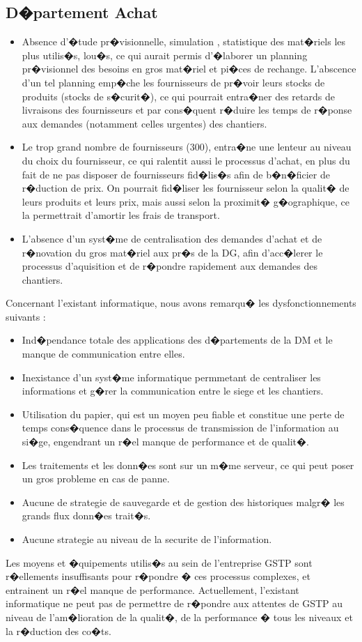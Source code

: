 \documentclass{article}
\begin{document}
		\subsection{D�partement Achat}
				\begin{itemize}
				    \item Absence d'�tude pr�visionnelle, simulation , statistique des mat�riels les plus utilis�s, lou�s, ce qui aurait permis d'�laborer un planning pr�visionnel des besoins en gros mat�riel et pi�ces de rechange. L'abscence d'un tel planning emp�che les fournisseurs de pr�voir leurs stocks de produits (stocks de s�curit�), ce qui pourrait entra�ner des retards de livraisons des fournisseurs et par cons�quent r�duire les temps de r�ponse aux demandes (notamment celles urgentes) des chantiers.
						\item Le trop grand nombre de fournisseurs (300), entra�ne une lenteur au niveau du choix du fournisseur, ce qui ralentit aussi le processus d'achat, en plus du fait de ne pas disposer de fournisseurs fid�lis�s afin de b�n�ficier de r�duction de prix. On pourrait fid�liser les fournisseur selon la qualit� de leurs produits et leurs prix, mais aussi selon la proximit� g�ographique, ce la permettrait d'amortir les frais de transport.
						\item L'absence d'un syst�me de centralisation des demandes d'achat et de r�novation du gros mat�riel aux pr�s de la DG, afin d'acc�lerer le processus d'aquisition et de r�pondre rapidement aux demandes des chantiers.
				\end{itemize}
		
		Concernant l'existant informatique, nous avons remarqu� les dysfonctionnements suivants :
		\begin{itemize}
				\item Ind�pendance totale des applications des d�partements de la DM et le manque de communication entre elles.
				\item Inexistance d'un syst�me informatique permmetant de centraliser les informations et g�rer la communication entre le siege et les chantiers.
				\item Utilisation du papier, qui est un moyen peu fiable et constitue une perte de temps cons�quence dans le processus de transmission de l'information au si�ge, engendrant un r�el manque de performance et de qualit�.
				\item Les traitements et les donn�es sont sur un m�me serveur, ce qui peut poser un gros probleme en cas de panne.
				\item Aucune de strategie de sauvegarde et de gestion des historiques malgr� les grands flux donn�es trait�s.
				\item Aucune strategie au niveau de la securite de l'information.
		\end{itemize}

		Les moyens et �quipements utilis�s au sein de l'entreprise GSTP sont r�ellements insuffisants pour r�pondre � ces processus complexes, et entrainent un r�el manque de performance. Actuellement, l'existant informatique ne peut pas de permettre de r�pondre aux attentes de
GSTP au niveau de l'am�lioration de la qualit�, de la performance � tous les niveaux et la r�duction des co�ts.
		
\end{document}
